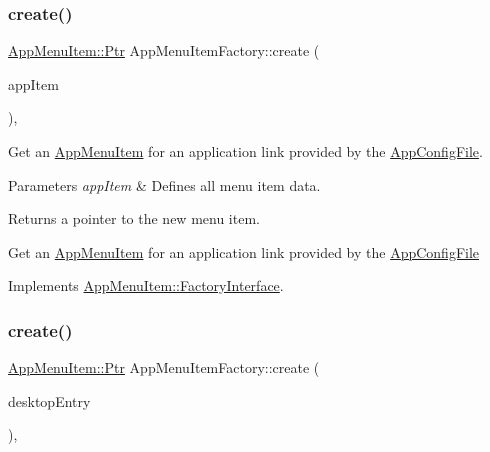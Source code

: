 \subsubsection{\texorpdfstring{create()}{create()}\hspace{0.1cm}{\footnotesize\ttfamily [1/3]}}
{\footnotesize\ttfamily \mbox{\hyperlink{classAppMenuItem_ab5f51c5d74f8df62b8862c0cc8126cb7}{App\+Menu\+Item\+::\+Ptr}} App\+Menu\+Item\+Factory\+::create (\begin{DoxyParamCaption}\item[{const \mbox{\hyperlink{structAppConfigFile_1_1AppItem}{App\+Config\+File\+::\+App\+Item}} \&}]{app\+Item }\end{DoxyParamCaption})\hspace{0.3cm}{\ttfamily [override]}, {\ttfamily [virtual]}}

Get an \mbox{\hyperlink{classAppMenuItem}{App\+Menu\+Item}} for an application link provided by the \mbox{\hyperlink{classAppConfigFile}{App\+Config\+File}}.


\begin{DoxyParams}{Parameters}
{\em app\+Item} & Defines all menu item data.\\
\hline
\end{DoxyParams}
\begin{DoxyReturn}{Returns}
a pointer to the new menu item.
\end{DoxyReturn}
Get an \mbox{\hyperlink{classAppMenuItem}{App\+Menu\+Item}} for an application link provided by the \mbox{\hyperlink{classAppConfigFile}{App\+Config\+File}} 

Implements \mbox{\hyperlink{classAppMenuItem_1_1FactoryInterface_a5b176b2573b638c01d71f05655d73ba0}{App\+Menu\+Item\+::\+Factory\+Interface}}.

\mbox{\label{classAppMenuItemFactory_a6b77c85063b587a6f5930fa9e94908eb}} 
\subsubsection{\texorpdfstring{create()}{create()}\hspace{0.1cm}{\footnotesize\ttfamily [2/3]}}
{\footnotesize\ttfamily \mbox{\hyperlink{classAppMenuItem_ab5f51c5d74f8df62b8862c0cc8126cb7}{App\+Menu\+Item\+::\+Ptr}} App\+Menu\+Item\+Factory\+::create (\begin{DoxyParamCaption}\item[{const \mbox{\hyperlink{classDesktopEntry}{Desktop\+Entry}} \&}]{desktop\+Entry }\end{DoxyParamCaption})\hspace{0.3cm}{\ttfamily [override]}, {\ttfamily [virtual]}}

